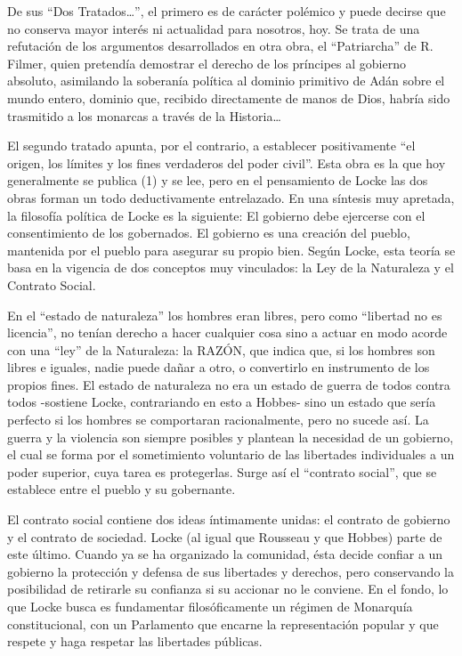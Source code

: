 \documentclass[
]{book}
\begin{document}
De sus ``Dos Tratados\ldots{}'', el primero es de carácter polémico y puede decirse que no conserva mayor interés ni actualidad para nosotros, hoy. Se trata de una refutación de los argumentos desarrollados en otra obra, el ``Patriarcha'' de R. Filmer, quien pretendía demostrar el derecho de los príncipes al gobierno absoluto, asimilando la soberanía política al dominio primitivo de Adán sobre el mundo entero, dominio que, recibido directamente de manos de Dios, habría sido trasmitido a los monarcas a través de la Historia\ldots{}

El segundo tratado apunta, por el contrario, a establecer positivamente ``el origen, los límites y los fines verdaderos del poder civil''. Esta obra es la que hoy generalmente se publica (1) y se lee, pero en el pensamiento de Locke las dos obras forman un todo deductivamente entrelazado. En una síntesis muy apretada, la filosofía política de Locke es la siguiente: El gobierno debe ejercerse con el consentimiento de los gobernados. El gobierno es una creación del pueblo, mantenida por el pueblo para asegurar su propio bien. Según Locke, esta teoría se basa en la vigencia de dos conceptos muy vinculados: la Ley de la Naturaleza y el Contrato Social.

En el ``estado de naturaleza'' los hombres eran libres, pero como ``libertad no es licencia'', no tenían derecho a hacer cualquier cosa sino a actuar en modo acorde con una ``ley'' de la Naturaleza: la RAZÓN, que indica que, si los hombres son libres e iguales, nadie puede dañar a otro, o convertirlo en instrumento de los propios fines. El estado de naturaleza no era un estado de guerra de todos contra todos -sostiene Locke, contrariando en esto a Hobbes- sino un estado que sería perfecto si los hombres se comportaran racionalmente, pero no sucede así. La guerra y la violencia son siempre posibles y plantean la necesidad de un gobierno, el cual se forma por el sometimiento voluntario de las libertades individuales a un poder superior, cuya tarea es protegerlas. Surge así el ``contrato social'', que se establece entre el pueblo y su gobernante.

El contrato social contiene dos ideas íntimamente unidas: el contrato de gobierno y el contrato de sociedad. Locke (al igual que Rousseau y que Hobbes) parte de este último. Cuando ya se ha organizado la comunidad, ésta decide confiar a un gobierno la protección y defensa de sus libertades y derechos, pero conservando la posibilidad de retirarle su confianza si su accionar no le conviene. En el fondo, lo que Locke busca es fundamentar filosóficamente un régimen de Monarquía constitucional, con un Parlamento que encarne la representación popular y que respete y haga respetar las libertades públicas.

  
\end{document}
